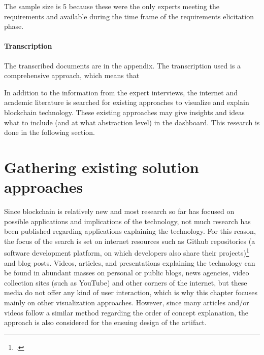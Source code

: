 The sample size is 5 because these were the only experts meeting the requirements and available during the time frame of the requirements elicitation phase.

\paragraph{Transcription} The transcribed documents are in the appendix. The transcription used is a comprehensive approach, which means that 

In addition to the information from the expert interviews, the internet and academic literature is searched for existing approaches to visualize and explain blockchain technology. These existing approaches may give insights and ideas what to include (and at what abstraction level) in the dashboard. This research is done in the following section.

\section{Gathering existing solution approaches}

Since blockchain is relatively new and most research so far has focused on possible applications and implications of the technology, not much research has been published regarding applications explaining the technology. For this reason, the focus of the search is set on internet resources such as Github repositories (a software development platform, on which developers also share their projects)\footcite[Cf.][]{GithubHowdevelopers} and blog posts. Videos, articles, and presentations explaining the technology can be found in abundant masses on personal or public blogs, news agencies, video collection sites (such as YouTube) and other corners of the internet, but these media do not offer any kind of user interaction, which is why this chapter focuses mainly on other visualization approaches. However, since many articles and/or videos follow a similar method regarding the order of concept explanation, the approach is also considered for the ensuing design of the artifact. 

